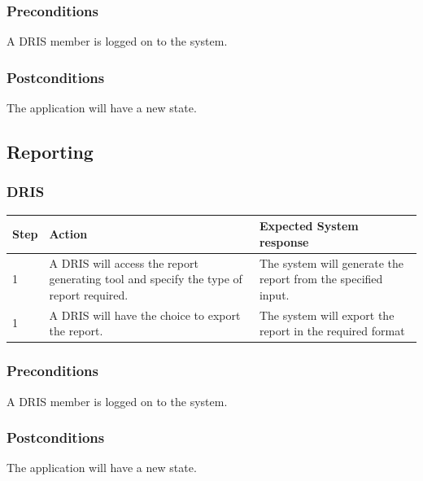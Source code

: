 \documentclass[12pt]{article}
\begin{document}
\subsubsection*{Preconditions}
A DRIS member is logged on to the system.

\subsubsection*{Postconditions}
The application will have a new state.

\subsection{Reporting}

\subsubsection{DRIS}

\begin{center}
\begin{tabular}{|l|p{6cm}|p{8cm}|}
\hline
Step & Action & Expected System response \\
\hline
1 & A DRIS will access the report generating tool and specify the type of report required. & The system will generate the report from the specified input. \\
\hline

1 & A DRIS will have the choice to export the report. & The system will export the report in the required format\\
\hline
\end{tabular}
\end{center}

\subsubsection*{Preconditions}
A DRIS member is logged on to the system.

\subsubsection*{Postconditions}
The application will have a new state.
\end{document}
